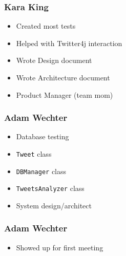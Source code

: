 \documentclass[a4paper, 12pt]{article}
\begin{document}
\subsubsection*{Kara King}
\begin{itemize}
\item Created most tests
\item Helped with Twitter4j interaction
\item Wrote Design document
\item Wrote Architecture document
\item Product Manager (team mom)
\end{itemize}

\subsubsection*{Adam Wechter}
\begin{itemize}
\item Database testing
\item \texttt{Tweet} class
\item \texttt{DBManager} class
\item \texttt{TweetsAnalyzer} class
\item System design/architect
\end{itemize}

\subsubsection*{Adam Wechter}
\begin{itemize}
\item Showed up for first meeting
\end{itemize}
\end{document}
